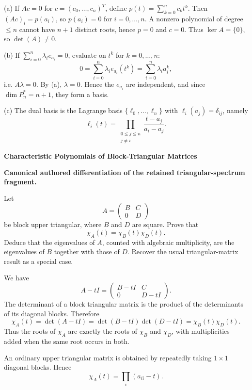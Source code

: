 \begin{solution}
(a) If \(Ac=0\) for \(c=(c_0,\dots,c_n)^T\), define \(p(t)=\sum_{k=0}^n c_k t^k\). Then \((Ac)_i=p(a_i)\), so \(p(a_i)=0\) for
\(i=0,\dots,n\). A nonzero polynomial of degree \(\le n\) cannot have \(n+1\) distinct roots, hence \(p=0\) and \(c=0\).
Thus \(\ker A=\{0\}\), so \(\det(A)\neq0\).

(b) If \(\sum_{i=0}^n \lambda_i e_{a_i}=0\), evaluate on \(t^k\) for \(k=0,\dots,n\):
\[
0=\sum_{i=0}^n \lambda_i e_{a_i}(t^k)=\sum_{i=0}^n \lambda_i a_i^k,
\]
i.e. \(A\lambda=0\). By (a), \(\lambda=0\). Hence the \(e_{a_i}\) are independent, and since \(\dim P_n^*=n+1\), they form a basis.

(c) The dual basis is the Lagrange basis \(\{\ell_0,\dots,\ell_n\}\) with \(\ell_i(a_j)=\delta_{ij}\), namely
\[
\ell_i(t)=\prod_{\substack{0\le j\le n\\ j\ne i}}\frac{t-a_j}{a_i-a_j}.
\]
\end{solution}

\begin{problem}[CP-I-0107]
\label{prob:cp-i-0107}
\textbf{Characteristic Polynomials of Block-Triangular Matrices}

\textbf{Canonical authored differentiation of the retained triangular-spectrum fragment.}

\hspace*{1.5em}Let
\[
A=
\begin{pmatrix}
B&C\\
0&D
\end{pmatrix}
\]
be block upper triangular, where \(B\) and \(D\) are square. Prove that
\[
\chi_A(t)=\chi_B(t)\chi_D(t).
\]
Deduce that the eigenvalues of \(A\), counted with algebraic multiplicity, are the eigenvalues of
\(B\) together with those of \(D\). Recover the usual triangular-matrix result as a special case.
\end{problem}

\begin{solution}
We have
\[
A-tI=
\begin{pmatrix}
B-tI&C\\
0&D-tI
\end{pmatrix}.
\]
The determinant of a block triangular matrix is the product of the determinants of its diagonal
blocks. Therefore
\[
\chi_A(t)=\det(A-tI)
=\det(B-tI)\det(D-tI)
=\chi_B(t)\chi_D(t).
\]
Thus the roots of \(\chi_A\) are exactly the roots of \(\chi_B\) and \(\chi_D\), with multiplicities
added when the same root occurs in both.

An ordinary upper triangular matrix is obtained by repeatedly taking \(1\times1\) diagonal
blocks. Hence
\[
\chi_A(t)=\prod_i(a_{ii}-t).
\]
\end{solution}

